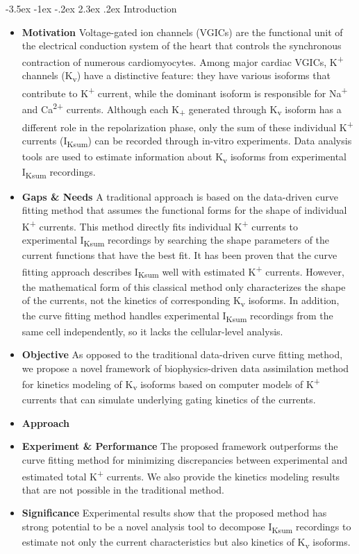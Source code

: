 \documentclass[11pt]{article}
\makeatletter
\renewcommand\section{\@startsection {section}{1}{\z@}%
                                   {-3.5ex \@plus -1ex \@minus -.2ex}%
                                   {2.3ex \@plus.2ex}%
                                   {\normalfont\fontfamily{phv}\fontsize{16}{19}\bfseries}}
\makeatother
\begin{document}
\section{Introduction} \label{s:intro}
\begin{itemize}
    \item \textbf{Motivation} Voltage-gated ion channels (VGICs) are the functional unit of the electrical conduction system of the heart that controls the synchronous contraction of numerous cardiomyocytes. Among major cardiac VGICs, K\textsuperscript{+} channels (K\textsubscript{v}) have a distinctive feature: they have various isoforms that contribute to K\textsuperscript{+} current, while the dominant isoform is responsible for Na\textsuperscript{+} and Ca\textsuperscript{2+} currents. Although each K\textsubscript{+} generated through K\textsubscript{v} isoform has a different role in the repolarization phase, only the sum of these individual K\textsuperscript{+} currents (I\textsubscript{Ksum}) can be recorded through in-vitro experiments. Data analysis tools are used to estimate information about K\textsubscript{v} isoforms from experimental I\textsubscript{Ksum} recordings.
    \item \textbf{Gaps \& Needs} A traditional approach is based on the data-driven curve fitting method that assumes the functional forms for the shape of individual K\textsuperscript{+} currents. This method directly fits individual K\textsuperscript{+} currents to experimental I\textsubscript{Ksum} recordings by searching the shape parameters of the current functions that have the best fit. It has been proven that the curve fitting approach describes I\textsubscript{Ksum} well with estimated K\textsuperscript{+} currents. However, the mathematical form of this classical method only characterizes the shape of the currents, not the kinetics of corresponding K\textsubscript{v} isoforms. In addition, the curve fitting method handles experimental I\textsubscript{Ksum} recordings from the same cell independently, so it lacks the cellular-level analysis.
    \item \textbf{Objective} As opposed to the traditional data-driven curve fitting method, we propose a novel framework of biophysics-driven data assimilation method for kinetics modeling of K\textsubscript{v} isoforms based on computer models of K\textsuperscript{+} currents that can simulate underlying gating kinetics of the currents.
    \item \textbf{Approach} 
    \item \textbf{Experiment \& Performance} The proposed framework outperforms the curve fitting method for minimizing discrepancies between experimental and estimated total K\textsuperscript{+} currents. We also provide the kinetics modeling results that are not possible in the traditional method.
    \item \textbf{Significance} Experimental results show that the proposed method has strong potential to be a novel analysis tool to decompose I\textsubscript{Ksum} recordings to estimate not only the current characteristics but also kinetics of K\textsubscript{v} isoforms.
\end{itemize}
\end{document}
